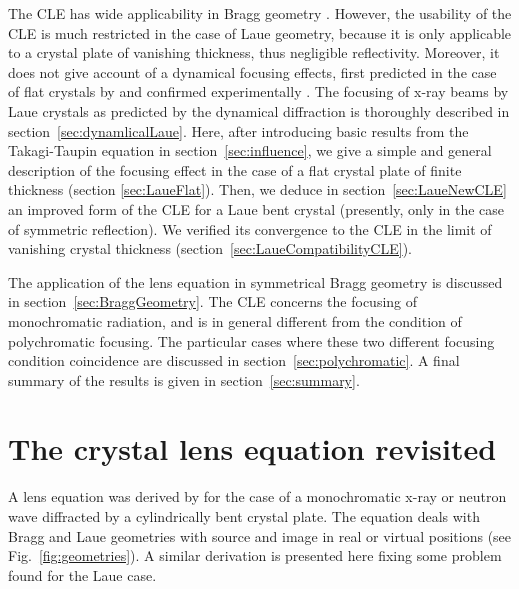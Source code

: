 \documentclass[preprint]{iucr}              %
\begin{document}
The CLE has wide applicability in Bragg geometry \cite{Caciuffo1987}. However, the usability of the CLE is much restricted in the case of Laue geometry, because it is only applicable to a crystal plate of vanishing thickness, thus negligible reflectivity. Moreover, it does not give account of a dynamical focusing effects, first  predicted in the case of flat crystals by \cite{AfanasevKohn1977} and confirmed experimentally \cite{Aristov1978, Aristov1980}. The focusing of x-ray beams by Laue crystals as predicted by the dynamical diffraction is  thoroughly described in section~\ref{sec:dynamlicalLaue}. Here, after introducing basic results from the Takagi-Taupin equation in section~\ref{sec:influence}, we give a simple and general description of the focusing effect in the case of a flat crystal plate of finite thickness (section \ref{sec:LaueFlat}). Then, we deduce in section~\ref{sec:LaueNewCLE} an improved form of the CLE for a Laue bent crystal (presently, only in the case of symmetric reflection). We verified its convergence to the CLE in the limit of vanishing crystal thickness (section~\ref{sec:LaueCompatibilityCLE}). 

The application of the lens equation in symmetrical Bragg geometry is discussed in section~\ref{sec:BraggGeometry}. %
The CLE concerns the focusing of monochromatic radiation, and is in general different from the condition of polychromatic focusing. The particular cases where these two different focusing condition coincidence  are discussed in section~\ref{sec:polychromatic}. A final summary of the results is given in section~\ref{sec:summary}.   


\section{The crystal lens equation revisited}
\label{sec:CLE}

A lens equation was derived by \cite{CK} for the case of a monochromatic x-ray or neutron wave diffracted by a cylindrically bent crystal plate. The equation deals with Bragg and Laue geometries with source and image in real or virtual positions (see Fig.~\ref{fig:geometries}). A similar derivation is presented here fixing some problem found for the Laue case.
\end{document}
